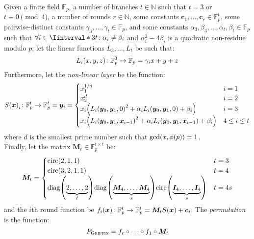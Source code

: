 \begin{definition}
  Given a finite field \(\mathbb{F}_p\), a number of branches \(t \in \mathbb{N}\) such that 
  \(t = 3\) or \(t \equiv 0 \pmod{4}\), a number of rounds \(r \in \mathbb{N}\), some constants 
  \(\bm{c}_{1}, \dots, \bm{c}_{r} \in \mathbb{F}_{p}^{t}\), some pairwise-distinct 
  constants \(\gamma_3, \dots, \gamma_t \in \mathbb{F}_{p}\), and some constants 
  \(\alpha_3, \beta_3, \dots, \alpha_t, \beta_t \in \mathbb{F}_{p}\) such that 
  \(\forall i \in \Iinterval*{3}{t}\colon \alpha_i \neq \beta_i\) and 
  \(\alpha_{i}^{2} - 4\beta_{i}\) is a quadratic non-residue modulo \(p\), 
  let the linear functions \(L_3, \dots, L_t\) be such that:
  \[\call{L_i}{x, y, z}\colon \mathbb{F}_p^3 \to \mathbb{F}_p = \gamma_{i}x + y + z\]
  Furthermore, let the \emph{non-linear layer} be the function:
  \[
    \call{S}{\bm{x}}_i\colon \mathbb{F}_{p}^{t} \to \mathbb{F}_{p}^{t} = \bm{y}_i =
    \begin{cases}
      x_{1}^{1/d}                                                         & i = 1         \\
      x_{2}^{d}                                                           & i = 2         \\
      x_{i}\Parens*{\call{L_i}{\bm{y}_0, \bm{y}_1, 0}^{2} + 
      \alpha_{i}\call{L_i}{\bm{y}_0, \bm{y}_1, 0} + \beta_i}              & i = 3         \\
      x_{i}\Parens*{\call{L_i}{\bm{y}_0, \bm{y}_1, \bm{x}_{i-1}}^{2} + 
      \alpha_{i}\call{L_i}{\bm{y}_0, \bm{y}_1, \bm{x}_{i-1}} + \beta_i}   & 4 \le i \le t
    \end{cases}
  \]
  where \(d\) is the smallest prime number such that \(\call{\gcd}{x, \call{\totient}{p}} = 1\).\\
  Finally, let the matrix \(\bm{M}_t \in \mathbb{F}_p^{t \times t}\) be:
  \[
    \bm{M}_t = 
    \begin{cases}
      \call{\circulant}{2, 1, 1} & t = 3 \\  
      \call{\circulant}{3, 2, 1, 1} & t = 4 \\
      \call{\diag}{\underbrace{2, \dots, 2}_{t}}
      \call{\diag}{\underbrace{\bm{M}_{4}, \dots, \bm{M}_4}_{s}}
      \call{\circulant}{\underbrace{\bm{I}_4, \dots, \bm{I}_4}_{s}}
      & t = 4s
    \end{cases}
  \]
  and the \(i\)th round function be
  \(\call{f_i}{\bm{x}}\colon \mathbb{F}_{p}^{t} \to \mathbb{F}_{p}^{t} = 
    \bm{M}_{t}\call{S}{\bm{x}} + \bm{c}_i\).
  The \emph{\Griffin{} permutation} is the function:
  \[
    P_{\textnormal{\textsc{Griffin}}} = f_{r} \circ \cdots \circ f_{1} \circ \bm{M}_{t}
  \]
\end{definition}

